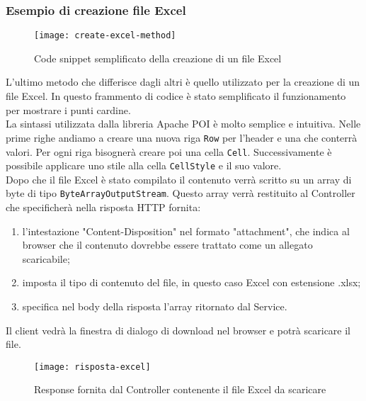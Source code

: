 \subsubsection{Esempio di creazione file Excel}
\begin{figure}[H] 
    \centering 
    \texttt{[image: create-excel-method]} 
    \caption{Code snippet semplificato della creazione di un file Excel}
\end{figure}
L'ultimo metodo che differisce dagli altri è quello utilizzato per la creazione di un file Excel. In questo frammento di codice è stato semplificato il funzionamento per mostrare i punti cardine.\\
La sintassi utilizzata dalla libreria Apache POI è molto semplice e intuitiva. Nelle prime righe andiamo a creare una nuova riga \texttt{Row} per l'header e una che conterrà valori. Per ogni riga bisognerà creare poi una cella \texttt{Cell}. Successivamente è possibile applicare uno stile alla cella \texttt{CellStyle} e il suo valore.\\
Dopo che il file Excel è stato compilato il contenuto verrà scritto su un array di byte di tipo \texttt{ByteArrayOutputStream}.
Questo array verrà restituito al Controller che specificherà nella risposta HTTP fornita:
\begin{enumerate}
\item l'intestazione "Content-Disposition" nel formato "attachment", che indica al browser che il contenuto dovrebbe essere trattato come un allegato scaricabile;
\item imposta il tipo di contenuto del file, in questo caso Excel con estensione .xlsx;
\item specifica nel body della risposta l'array ritornato dal Service.
\end{enumerate}
Il client vedrà la finestra di dialogo di download nel browser e potrà scaricare il file.
\begin{figure}[H] 
    \centering 
    \texttt{[image: risposta-excel]} 
    \caption{Response fornita dal Controller contenente il file Excel da scaricare}
\end{figure}